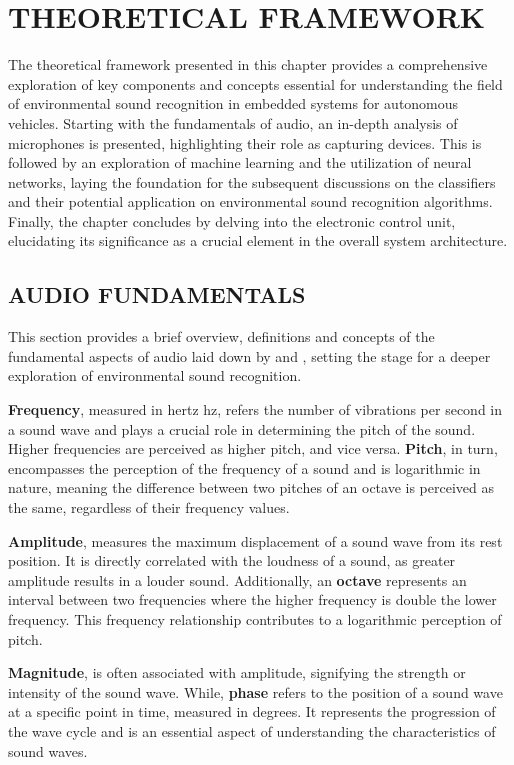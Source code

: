 \chapter{THEORETICAL FRAMEWORK}
\label{chp:frmwk}

The theoretical framework presented in this chapter provides a comprehensive exploration of key components and concepts essential for understanding the field of environmental sound recognition in embedded systems for autonomous vehicles. Starting with the fundamentals of audio, an in-depth analysis of microphones is presented, highlighting their role as capturing devices. This is followed by an exploration of machine learning and the utilization of neural networks, laying the foundation for the subsequent discussions on the classifiers and their potential application on environmental sound recognition algorithms. Finally, the chapter concludes by delving into the electronic control unit, elucidating its significance as a crucial element in the overall system architecture. 


\section{AUDIO FUNDAMENTALS}
\label{sec:frmwk_audio_fund}

This section provides a brief overview, definitions and concepts of the fundamental aspects of audio laid down by \textcite{Mueller2016} and \textcite{Pelgrom2018}, setting the stage for a deeper exploration of environmental sound recognition.

\textbf{Frequency}, measured in hertz \gls{hz}, refers the number of vibrations per second in a sound wave and plays a crucial role in determining the pitch of the sound. Higher frequencies are perceived as higher pitch, and vice versa. \textbf{Pitch}, in turn, encompasses the perception of the frequency of a sound and is logarithmic in nature, meaning the difference between two pitches of an octave is perceived as the same, regardless of their frequency values.

\textbf{Amplitude}, measures the maximum displacement of a sound wave from its rest position. It is directly correlated with the loudness of a sound, as greater amplitude results in a louder sound. Additionally, an \textbf{octave} represents an interval between two frequencies where the higher frequency is double the lower frequency. This frequency relationship contributes to a logarithmic perception of pitch.

\textbf{Magnitude}, is often associated with amplitude, signifying the strength or intensity of the sound wave. While, \textbf{phase} refers to the position of a sound wave at a specific point in time, measured in degrees. It represents the progression of the wave cycle and is an essential aspect of understanding the characteristics of sound waves.

